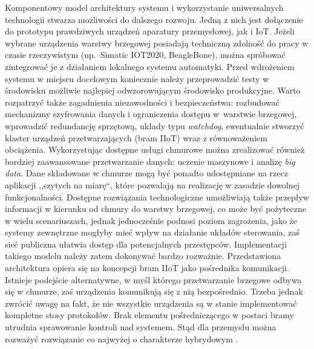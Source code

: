 \documentclass[a4paper, 12pt, twoside]{article}
\begin{document}
Komponentowy model architektury systemu i wykorzystanie uniwersalnych technologii
stwarza możliwości do dalszego rozwoju. Jedną z nich jest dołączenie do prototypu
prawdziwych urządzeń aparatury przemysłowej, jak i IoT. Jeżeli wybrane urządzenia
warstwy brzegowej posiadają techniczną zdolność do pracy w czasie rzeczywistym
(np.~Simatic IOT2020, BeagleBone),
można spróbować zintegrować je z działaniem lokalnego systemu automatyki. Przed wdrożeniem
systemu w miejscu docelowym koniecznie należy przeprowadzić testy w środowisku
możliwie najlepiej odwzorowującym środowisko produkcyjne. Warto rozpatrzyć także
zagadnienia niezawodności i bezpieczeństwa: rozbudować mechanizmy szyfrowania danych
i ograniczenia dostępu w~warstwie brzegowej, wprowadzić redundancję sprzętową,
układy typu \emph{watchdog}, ewentualnie stworzyć klaster urządzeń przetwarzających
(bram IIoT) wraz z równoważeniem obciążenia. Wykorzystując dostępne usługi
chmurowe można zrealizować również bardziej zaawansowane przetwarzanie danych:
uczenie maszynowe i analizę \emph{big data}. Dane składowane w chmurze mogą być
ponadto udostępniane na rzecz aplikacji ,,szytych na miarę``, które pozwalają
na realizację w zasadzie dowolnej funkcjonalności. Dostępne rozwiązania technologiczne
umożliwiają także przepływ informacji w kierunku od chmury do warstwy brzegowej,
co może być pożyteczne w wielu scenariuszach, jednak jednocześnie podnosi
poziom zagrożenia, jako że systemy zewnętrzne mogłyby mieć wpływ na działanie
układów sterowania, zaś sieć publiczna ułatwia dostęp dla potencjalnych przestępców.
Implementacji takiego modelu należy zatem dokonywać bardzo rozważnie.
Przedstawiona architektura opiera się na koncepcji bram IIoT jako pośrednika
komunikacji. Istnieje podejście alternatywne, w myśl którego przetwarzanie brzegowe
odbywa się w chmurze, zaś urządzenia komunikują się z nią bezpośrednio. Trzeba
jednak zwrócić uwagę na fakt, że nie wszystkie urządzenia są w stanie implementować
kompletne stosy protokołów. Brak elementu pośredniczącego w postaci bramy utrudnia
sprawowanie kontroli nad systemem. Stąd dla przemysłu można rozważyć
rozwiązanie co najwyżej o charakterze hybrydowym \cite{analysis-of-different-iot-protocols}.

\newpage
\printbibliography
\end{document}
